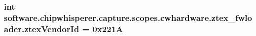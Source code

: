 \subsubsection[{ztex\+Vendor\+Id}]{\setlength{\rightskip}{0pt plus 5cm}int software.\+chipwhisperer.\+capture.\+scopes.\+cwhardware.\+ztex\+\_\+fwloader.\+ztex\+Vendor\+Id = 0x221\+A}\label{namespacesoftware_1_1chipwhisperer_1_1capture_1_1scopes_1_1cwhardware_1_1ztex__fwloader_a00d9864865923c039174394302a9adb0}
